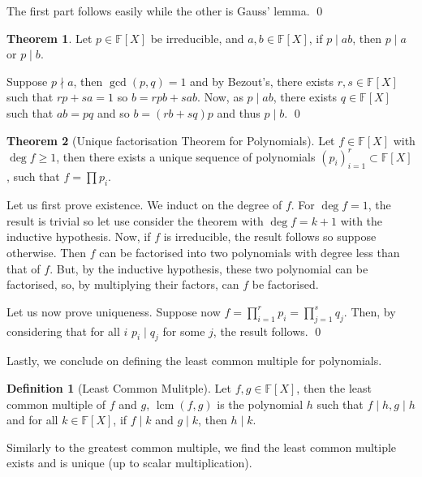 \documentclass[
]{article}
\theoremstyle{definition}
\newtheorem{theorem}{Theorem}
\theoremstyle{definition}
\newtheorem{definition}{Definition}[section]
\begin{document}
The first part follows easily while the other is Gauss' lemma. \qed

\begin{theorem}
  Let \(p \in \mathbb{F}[X]\) be irreducible, and \(a, b \in \mathbb{F}[X]\), 
  if \(p \mid ab\), then \(p \mid a\) or \(p \mid b\).
\end{theorem}
\proof

Suppose \(p \nmid a\), then \(\gcd(p, q) = 1\) and by Bezout's, there
exists \(r, s \in \mathbb{F}[X]\) such that \(rp + sa = 1\) so
\(b = rpb + sab\). Now, as \(p \mid ab\), there exists
\(q \in \mathbb{F}[X]\) such that \(ab = pq\) and so \(b = (rb + sq)p\)
and thus \(p \mid b\). \qed

\begin{theorem}[Unique factorisation Theorem for Polynomials]
  Let \(f \in \mathbb{F}[X]\) with \(\deg f \ge 1\), then there exists a unique 
  sequence of polynomials \((p_i)_{i = 1}^r \subset \mathbb{F}[X]\), such that 
  \(f = \prod p_i\).
\end{theorem}
\proof

Let us first prove existence. We induct on the degree of \(f\). For
\(\deg f = 1\), the result is trivial so let use consider the theorem
with \(\deg f = k + 1\) with the inductive hypothesis. Now, if \(f\) is
irreducible, the result follows so suppose otherwise. Then \(f\) can be
factorised into two polynomials with degree less than that of \(f\).
But, by the inductive hypothesis, these two polynomial can be
factorised, so, by multiplying their factors, can \(f\) be factorised.

Let us now prove uniqueness. Suppose now
\(f = \prod_{i = 1}^r p_i =  \prod_{j = 1}^s q_j\). Then, by considering
that for all \(i\) \(p_i \mid q_j\) for some \(j\), the result follows.
\qed

Lastly, we conclude on defining the least common multiple for
polynomials.

\begin{definition}[Least Common Mulitple]
  Let \(f, g \in \mathbb{F}[X]\), then the least common multiple of \(f\) and 
  \(g\), \(\mathop{\mathrm{lcm}}(f, g)\) is the polynomial \(h\) such that \(f \mid h, g \mid h\) 
  and for all \(k \in \mathbb{F}[X]\), if \(f \mid k\) and \(g \mid k\), then 
  \(h \mid k\).
\end{definition}

Similarly to the greatest common multiple, we find the least common
multiple exists and is unique (up to scalar multiplication).
\end{document}
